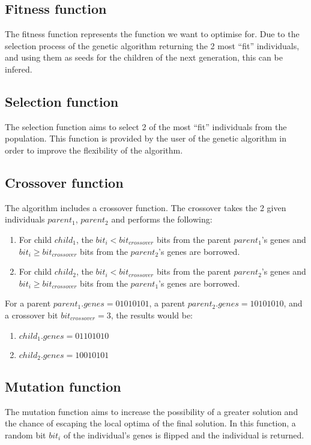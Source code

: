 \documentclass[conference]{IEEEtran}
\begin{document}
\subsection{Fitness function}
The fitness function represents the function we want to optimise for. Due to the selection process of the genetic
algorithm returning the 2 most ``fit'' individuals, and using them as seeds for the children of the next generation,
this can be infered.

\subsection{Selection function}
The selection function aims to select 2 of the most ``fit'' individuals from the population. This function is provided
by the user of the genetic algorithm in order to improve the flexibility of the algorithm.

\subsection{Crossover function}
The algorithm includes a crossover function. The crossover takes the 2 given individuals $parent_1$, $parent_2$ and performs the following:

\begin{enumerate}
    \item For child $child_1$, the $bit_i < bit_{crossover}$ bits from the parent $parent_1$'s genes and $bit_i \ge bit_{crossover}$ bits from the $parent_2$'s genes are borrowed.
    \item For child $child_2$, the $bit_i < bit_{crossover}$ bits from the parent $parent_2$'s genes and $bit_i \ge bit_{crossover}$ bits from the $parent_1$'s genes are borrowed.
\end{enumerate}

For a parent $parent_1.genes = 01010101$, a parent $parent_2.genes = 10101010$, and a crossover bit $bit_{crossover} = 3$, the results would be:

\begin{enumerate}
    \item $child_1.genes = 01101010$
    \item $child_2.genes = 10010101$
\end{enumerate}

\subsection{Mutation function}
The mutation function aims to increase the possibility of a greater solution and the chance of escaping
the local optima of the final solution. In this function, a random bit $bit_i$ of the individual's genes
is flipped and the individual is returned.
\end{document}
